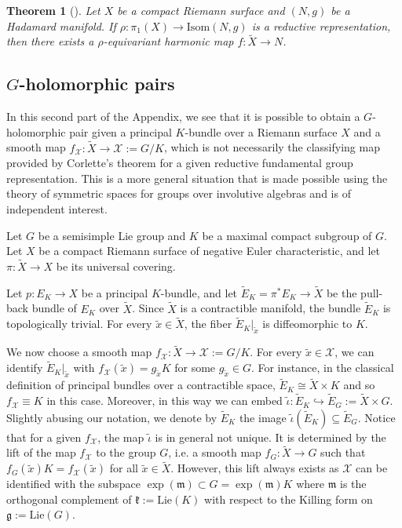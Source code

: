 \documentclass[oneside,11pt]{amsart}
\newtheorem{thm}{Theorem}[section]
\theoremstyle{definition}
\theoremstyle{remark}
\numberwithin{thm}{section}
\numberwithin{equation}{section}
\begin{document}
\begin{thm}[{\cite[Theorem 1.1]{Sagman}}]\label{Sagman-harmonic}
    Let $X$ be a compact Riemann surface and $(N,g)$ be a Hadamard manifold. If $\rho \colon \pi_1(X) \to \mathrm{Isom}(N,g)$ is a reductive representation, then there exists a $\rho$-equivariant harmonic map $f \colon \tilde{X}\to N$.
\end{thm}



  


\subsection{\texorpdfstring{$G$}{G}-holomorphic pairs}\label{sec:general_defs}

In this second part of the Appendix, we see that it is possible to obtain a $G$-holomorphic pair given a principal $K$-bundle over a Riemann surface $X$ and a smooth map $f_{\mathcal{X}}\colon \tilde{X} \to \mathcal{X}:=G/K$, which is not necessarily the classifying map provided by Corlette's theorem for a given reductive fundamental group representation. This is a more general situation that is made possible using the theory of symmetric spaces for groups over involutive algebras and is of independent interest.



Let $G$ be a semisimple Lie group and $K$ be a maximal compact subgroup of $G$. Let $X$ be a compact Riemann surface of negative Euler characteristic, and let $\pi\colon \tilde X\to X$ be its universal covering. 

Let $p\colon E_K\to X$ be a principal $K$-bundle, and let $\tilde E_K=\pi^* E_K\to \tilde X$ be the pull-back bundle of $E_K$ over $\tilde X$. Since $\tilde X$ is a contractible manifold, the bundle $\tilde E_K$ is topologically trivial. For every $\tilde x \in \tilde X$, the fiber $\tilde E_K|_{\tilde x}$ is diffeomorphic to $K$. 

We now choose a smooth map $f_{\mathcal X}\colon \tilde X\to \mathcal X:=G/K$. For every $\tilde{x}\in \mathcal{X}$, we can identify $\tilde E_K|_{\tilde x}$ with $f_{\mathcal{X}}(\tilde{x})=g_{\tilde x}K$ for some $g_{\tilde x}\in G$. For instance, in the classical definition of principal bundles over a contractible space, $\tilde{E}_K \cong \tilde{X} \times K$ and so $f_{\mathcal X}\equiv K$ in this case. Moreover, in this way we can embed $\tilde \iota\colon \tilde E_K \hookrightarrow \tilde E_G:=\tilde X\times G$. Slightly abusing our notation, we denote by $\tilde E_K$ the image $\tilde\iota(\tilde E_K)\subseteq \tilde E_G$. Notice that for a given $f_\mathcal X$, the map  $\tilde\iota$ is in general not unique. It is determined by the lift of the map $f_\mathcal X$ to the group $G$, i.e. a smooth map $f_G\colon \tilde X\to G$ such that $f_G(\tilde x)K=f_\mathcal X(\tilde x)$ for all $\tilde x\in\tilde X$. However, this lift always exists as $\mathcal X$ can be identified with the subspace $\exp(\mathfrak m)\subset G=\exp(\mathfrak m) K$ where $\mathfrak m$ is the orthogonal complement of $\mathfrak k:=\mathrm{Lie}(K)$ with respect to the Killing form on $\mathfrak g:=\mathrm{Lie}(G)$.
\end{document}
